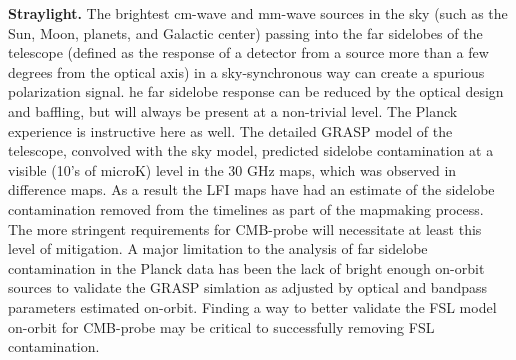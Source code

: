 \textbf{Straylight.}   The brightest cm-wave and mm-wave sources in
the sky (such as the Sun, Moon, planets, and Galactic center) passing
into the far sidelobes of the telescope (defined as the response of a
detector from a source more than a few degrees from the optical axis)
in a sky-synchronous way can create a spurious polarization signal.
he far sidelobe response can be reduced by the optical design and baffling, but will always be present at a non-trivial level.  The Planck experience is instructive here as well.  The detailed GRASP model of the telescope, convolved with the sky model, predicted sidelobe contamination at a visible (10's of microK) level in the 30 GHz maps, which was observed in difference maps.  As a result the LFI maps have had an estimate of the sidelobe contamination removed from the timelines as part of the mapmaking process. The more stringent requirements for CMB-probe will necessitate at least this level of mitigation.  A major limitation to the analysis of far sidelobe contamination in the Planck data has been the lack of bright enough on-orbit sources to validate the GRASP simlation as adjusted by optical and bandpass parameters estimated on-orbit. Finding a way to better validate the FSL model on-orbit for CMB-probe may be critical to successfully removing FSL contamination.



